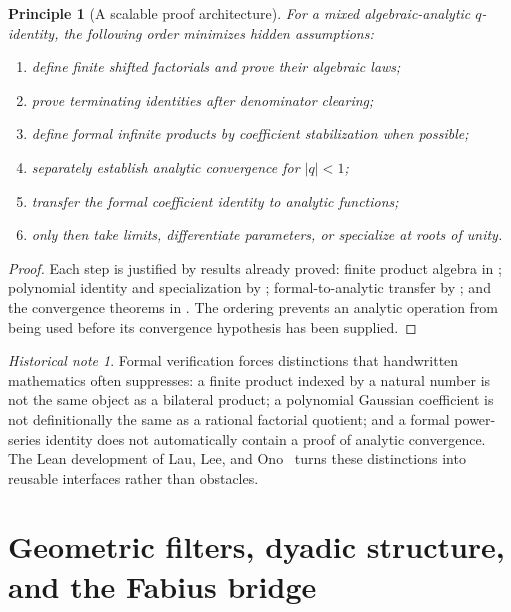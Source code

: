\documentclass[11pt,oneside,openany]{book}
\newtheorem{principle}[theorem]{Principle}
\theoremstyle{definition}
\theoremstyle{remark}
\newtheorem{historicalnote}[theorem]{Historical note}
\newcommand{\abs}[1]{\lvert #1\rvert}
\begin{document}
\begin{principle}[A scalable proof architecture]\label{prin:proof-architecture}
For a mixed algebraic-analytic $q$-identity, the following order minimizes hidden assumptions:
\begin{enumerate}
\item define finite shifted factorials and prove their algebraic laws;
\item prove terminating identities after denominator clearing;
\item define formal infinite products by coefficient stabilization when possible;
\item separately establish analytic convergence for $\abs q<1$;
\item transfer the formal coefficient identity to analytic functions;
\item only then take limits, differentiate parameters, or specialize at roots of unity.
\end{enumerate}
\end{principle}

\begin{proof}
Each step is justified by results already proved: finite product algebra in ; polynomial identity and specialization by ; formal-to-analytic transfer by ; and the convergence theorems in .  The ordering prevents an analytic operation from being used before its convergence hypothesis has been supplied.
\end{proof}

\begin{historicalnote}
Formal verification forces distinctions that handwritten mathematics often suppresses: a finite product indexed by a natural number is not the same object as a bilateral product; a polynomial Gaussian coefficient is not definitionally the same as a rational factorial quotient; and a formal power-series identity does not automatically contain a proof of analytic convergence.  The Lean development of Lau, Lee, and Ono~\cite{LauLeeOno2026} turns these distinctions into reusable interfaces rather than obstacles.
\end{historicalnote}

\part{Geometric filters, dyadic structure, and the Fabius bridge}
\end{document}
